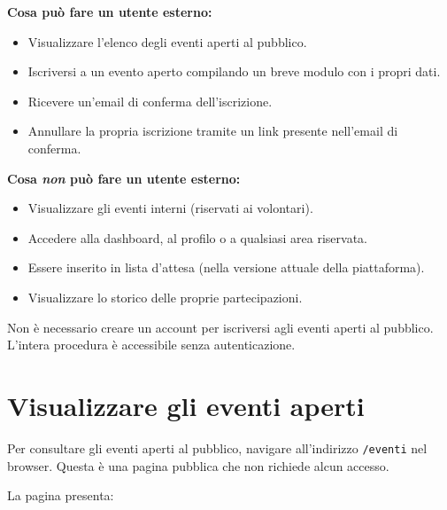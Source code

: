 \documentclass[a4paper,11pt,oneside]{book}
\newcommand{\percorso}[1]{\textcolor{namoCyan}{\texttt{#1}}}
\begin{document}
\textbf{Cosa pu\`o fare un utente esterno:}
\begin{itemize}[leftmargin=1.5em]
  \item Visualizzare l'elenco degli eventi aperti al pubblico.
  \item Iscriversi a un evento aperto compilando un breve modulo con i propri dati.
  \item Ricevere un'email di conferma dell'iscrizione.
  \item Annullare la propria iscrizione tramite un link presente nell'email di conferma.
\end{itemize}

\textbf{Cosa \textit{non} pu\`o fare un utente esterno:}
\begin{itemize}[leftmargin=1.5em]
  \item Visualizzare gli eventi interni (riservati ai volontari).
  \item Accedere alla dashboard, al profilo o a qualsiasi area riservata.
  \item Essere inserito in lista d'attesa (nella versione attuale della piattaforma).
  \item Visualizzare lo storico delle proprie partecipazioni.
\end{itemize}

\begin{infobox}
Non \`e necessario creare un account per iscriversi agli eventi aperti al pubblico. L'intera procedura \`e accessibile senza autenticazione.
\end{infobox}

\section{Visualizzare gli eventi aperti}
\label{sec:visualizzare-eventi-aperti}

Per consultare gli eventi aperti al pubblico, navigare all'indirizzo \percorso{/eventi} nel browser. Questa \`e una pagina pubblica che non richiede alcun accesso.

La pagina presenta:
\end{document}
